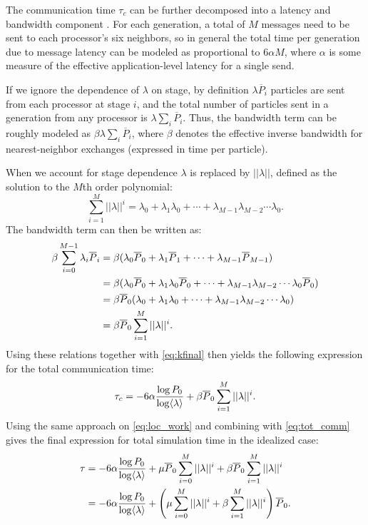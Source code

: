 The communication time $\tau_c$ can be further decomposed into a latency and
bandwidth component \cite{jcp-siegel-2012-1}. For each generation, a total of
$M$ messages need to be sent to each processor's six neighbors, so in general
the total time per generation due to message latency can be modeled as
proportional to $6 \alpha M$, where $\alpha$ is some measure of the effective
application-level latency for a single send.

If we ignore the dependence of $\lambda$ on stage, by definition $\lambda
\overline{P}_i$ particles are sent from each processor at stage $i$, and the
total number of particles sent in a generation from any processor is $\lambda
\sum_i \overline{P}_i$. Thus, the bandwidth term can be roughly modeled as
$\beta \lambda \sum_i \overline{P}_i$, where $\beta$ denotes the effective
inverse bandwidth for nearest-neighbor exchanges (expressed in time per
particle).

When we account for stage dependence $\lambda$ is replaced by $||\lambda||$,
defined as the solution to the $M$th order polynomial:
\begin{equation}
  \label{eq:lmean}
  \sum_{i=1}^M ||\lambda||^i = \lambda_0 + \lambda_1\lambda_0 + \cdots +
  \lambda_{M-1}\lambda_{M-2}\dotsm\lambda_0.
\end{equation}
The bandwidth term can then be written as:
\begin{align}
  \beta \sum_{i=0}^{M-1} \lambda_i \overline{P}_i &= \beta(\lambda_0
  \overline{P}_0 + \lambda_1 \overline{P}_1 + \dotsb +
  \lambda_{M-1}\overline{P}_{M-1}) \nonumber \\
  &= \beta(\lambda_0 \overline{P}_0 + \lambda_1 \lambda_0 \overline{P}_0 + \dotsb +
  \lambda_{M-1}\lambda_{M-2}\dotsm\lambda_0 \overline{P}_0) \nonumber \\
  &=\beta\overline{P}_0(\lambda_0 + \lambda_1\lambda_0 + \dotsb +
  \lambda_{M-1}\lambda_{M-2}\dotsm\lambda_0) \nonumber \\
  &= \beta\overline{P}_0\sum_{i=1}^M ||\lambda||^i.
\end{align}
Using these relations together with \eqref{eq:kfinal} then yields the following
expression for the total communication time:
\begin{equation}
  \label{eq:tot_comm}
  \tau_c = -6 \alpha \frac{\log P_0}{\log \langle \lambda \rangle} + \beta\overline{P}_0\sum_{i=1}^M
  ||\lambda||^i.
\end{equation}
Using the same approach on \eqref{eq:loc_work} and combining with
\eqref{eq:tot_comm} gives the final expression for total simulation time in the
idealized case:
\begin{align}
  \label{eq:tau1}
  \tau &= -6 \alpha \frac{\log P_0}{\log \langle \lambda \rangle} + \mu \overline{P}_0 \sum_{i=0}^M
  ||\lambda||^i + \beta\overline{P}_0\sum_{i=1}^M ||\lambda||^i \nonumber \\
  &= -6 \alpha \frac{\log P_0}{\log \langle \lambda \rangle} + \left ( \mu \sum_{i=0}^M
  ||\lambda||^i + \beta\sum_{i=1}^M ||\lambda||^i \right ) \overline{P}_0.
\end{align}

